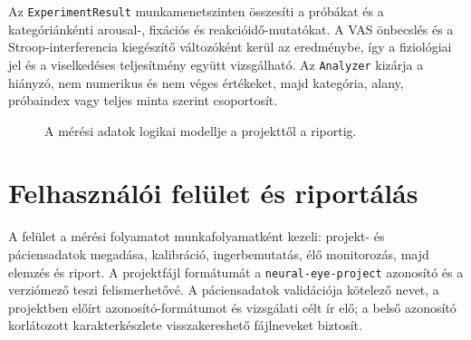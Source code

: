 \documentclass[12pt,a4paper,oneside]{book}
\begin{document}
Az \texttt{ExperimentResult} munkamenetszinten összesíti a próbákat és a kategóriánkénti arousal-, fixációs és reakcióidő-mutatókat. A VAS önbecslés és a Stroop-interferencia kiegészítő változóként kerül az eredménybe, így a fiziológiai jel és a viselkedéses teljesítmény együtt vizsgálható. Az \texttt{Analyzer} kizárja a hiányzó, nem numerikus és nem véges értékeket, majd kategória, alany, próbaindex vagy teljes minta szerint csoportosít.

\begin{figure}[H]
    \centering
    \caption{A mérési adatok logikai modellje a projekttől a riportig.}
    \label{fig:data_model}
\end{figure}

\section{Felhasználói felület és riportálás}

A felület a mérési folyamatot munkafolyamatként kezeli: projekt- és páciensadatok megadása, kalibráció, ingerbemutatás, élő monitorozás, majd elemzés és riport. A projektfájl formátumát a \texttt{neural-eye-project} azonosító és a verziómező teszi felismerhetővé. A páciensadatok validációja kötelező nevet, a projektben előírt azonosító-formátumot és vizsgálati célt ír elő; a belső azonosító korlátozott karakterkészlete visszakereshető fájlneveket biztosít.
\end{document}
